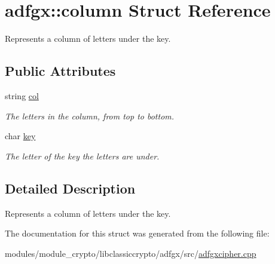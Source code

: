 \hypertarget{structadfgx_1_1column}{}\section{adfgx\+:\+:column Struct Reference}
\label{structadfgx_1_1column}


Represents a column of letters under the key.  


\subsection*{Public Attributes}
\begin{DoxyCompactItemize}
\item 
string \hyperlink{structadfgx_1_1column_a5ff8654328717b7fb0bef4ac409d61cc}{col}\hypertarget{structadfgx_1_1column_a5ff8654328717b7fb0bef4ac409d61cc}{}\label{structadfgx_1_1column_a5ff8654328717b7fb0bef4ac409d61cc}

\begin{DoxyCompactList}\small\item\em The letters in the column, from top to bottom. \end{DoxyCompactList}\item 
char \hyperlink{structadfgx_1_1column_a44508c4470bc666583601b869213f1be}{key}\hypertarget{structadfgx_1_1column_a44508c4470bc666583601b869213f1be}{}\label{structadfgx_1_1column_a44508c4470bc666583601b869213f1be}

\begin{DoxyCompactList}\small\item\em The letter of the key the letters are under. \end{DoxyCompactList}\end{DoxyCompactItemize}


\subsection{Detailed Description}
Represents a column of letters under the key. 

The documentation for this struct was generated from the following file\+:\begin{DoxyCompactItemize}
\item 
modules/module\+\_\+crypto/libclassiccrypto/adfgx/src/\hyperlink{adfgxcipher_8cpp}{adfgxcipher.\+cpp}\end{DoxyCompactItemize}
